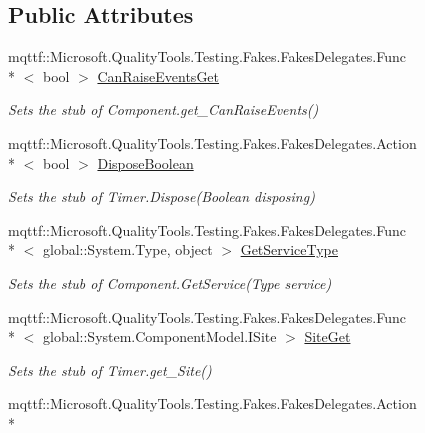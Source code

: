 \subsection*{Public Attributes}
\begin{DoxyCompactItemize}
\item 
mqttf\-::\-Microsoft.\-Quality\-Tools.\-Testing.\-Fakes.\-Fakes\-Delegates.\-Func\\*
$<$ bool $>$ \hyperlink{class_system_1_1_timers_1_1_fakes_1_1_stub_timer_ae42b0a35899864c2644fb9c6377591d6}{Can\-Raise\-Events\-Get}
\begin{DoxyCompactList}\small\item\em Sets the stub of Component.\-get\-\_\-\-Can\-Raise\-Events()\end{DoxyCompactList}\item 
mqttf\-::\-Microsoft.\-Quality\-Tools.\-Testing.\-Fakes.\-Fakes\-Delegates.\-Action\\*
$<$ bool $>$ \hyperlink{class_system_1_1_timers_1_1_fakes_1_1_stub_timer_a28403f419c15c92151d7cb950900b530}{Dispose\-Boolean}
\begin{DoxyCompactList}\small\item\em Sets the stub of Timer.\-Dispose(\-Boolean disposing)\end{DoxyCompactList}\item 
mqttf\-::\-Microsoft.\-Quality\-Tools.\-Testing.\-Fakes.\-Fakes\-Delegates.\-Func\\*
$<$ global\-::\-System.\-Type, object $>$ \hyperlink{class_system_1_1_timers_1_1_fakes_1_1_stub_timer_a12eee29b116a25ab39d71ff215a59032}{Get\-Service\-Type}
\begin{DoxyCompactList}\small\item\em Sets the stub of Component.\-Get\-Service(\-Type service)\end{DoxyCompactList}\item 
mqttf\-::\-Microsoft.\-Quality\-Tools.\-Testing.\-Fakes.\-Fakes\-Delegates.\-Func\\*
$<$ global\-::\-System.\-Component\-Model.\-I\-Site $>$ \hyperlink{class_system_1_1_timers_1_1_fakes_1_1_stub_timer_a662c6a99e082bc51329484168b466ddc}{Site\-Get}
\begin{DoxyCompactList}\small\item\em Sets the stub of Timer.\-get\-\_\-\-Site()\end{DoxyCompactList}\item 
mqttf\-::\-Microsoft.\-Quality\-Tools.\-Testing.\-Fakes.\-Fakes\-Delegates.\-Action\\*

\end{DoxyCompactItemize}
